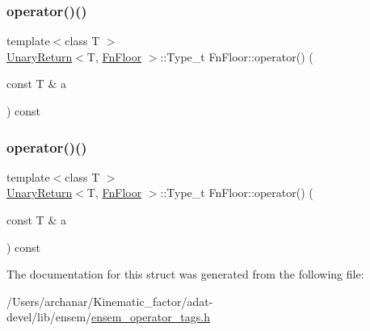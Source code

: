 \mbox{\label{structFnFloor_ab74b902d8ab286ae5ec2c6066140919b}} 
\subsubsection{\texorpdfstring{operator()()}{operator()()}\hspace{0.1cm}{\footnotesize\ttfamily [2/3]}}
{\footnotesize\ttfamily template$<$class T $>$ \\
\mbox{\hyperlink{structUnaryReturn}{Unary\+Return}}$<$T, \mbox{\hyperlink{structFnFloor}{Fn\+Floor}} $>$\+::Type\+\_\+t Fn\+Floor\+::operator() (\begin{DoxyParamCaption}\item[{const T \&}]{a }\end{DoxyParamCaption}) const\hspace{0.3cm}{\ttfamily [inline]}}

\mbox{\label{structFnFloor_ab74b902d8ab286ae5ec2c6066140919b}} 
\subsubsection{\texorpdfstring{operator()()}{operator()()}\hspace{0.1cm}{\footnotesize\ttfamily [3/3]}}
{\footnotesize\ttfamily template$<$class T $>$ \\
\mbox{\hyperlink{structUnaryReturn}{Unary\+Return}}$<$T, \mbox{\hyperlink{structFnFloor}{Fn\+Floor}} $>$\+::Type\+\_\+t Fn\+Floor\+::operator() (\begin{DoxyParamCaption}\item[{const T \&}]{a }\end{DoxyParamCaption}) const\hspace{0.3cm}{\ttfamily [inline]}}



The documentation for this struct was generated from the following file\+:\begin{DoxyCompactItemize}
\item 
/\+Users/archanar/\+Kinematic\+\_\+factor/adat-\/devel/lib/ensem/\mbox{\hyperlink{adat-devel_2lib_2ensem_2ensem__operator__tags_8h}{ensem\+\_\+operator\+\_\+tags.\+h}}\end{DoxyCompactItemize}
